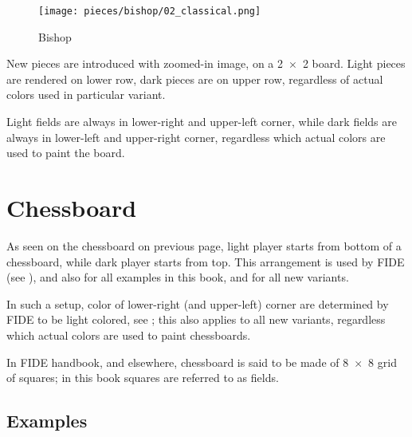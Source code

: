 \noindent
\begin{wrapfigure}[12]{l}{0.4\textwidth}
\centering
\texttt{[image: pieces/bishop/02\_classical.png]}
\caption{Bishop}
\label{fig:bishop/02_classical}
\end{wrapfigure}
New pieces are introduced with zoomed-in image, on a \mbox{2 $\times$ 2} board.
Light pieces are rendered on lower row, dark pieces are on upper row,
regardless of actual colors used in particular variant. %

Light fields are always in lower-right and upper-left corner, while dark fields
are always in lower-left and upper-right corner, regardless which actual colors
are used to paint the board.


\section*{Chessboard}
\label{sec:Classical Chess/Chessboard}

As seen on the chessboard on previous page, light player starts from bottom of
a chessboard, while dark player starts from top. This arrangement is used by FIDE
(see ), and also for all examples in this book, and for all new
variants.

In such a setup, color of lower-right (and upper-left) corner are determined by
FIDE to be light colored, see ; this also applies to all new
variants, regardless which actual colors are used to paint chessboards.

In FIDE handbook, and elsewhere, chessboard is said to be made of \mbox{8 $\times$ 8}
grid of squares; in this book squares are referred to as fields.

\clearpage %

\subsection*{Examples}
\label{sec:Classical Chess/Chessboard/Examples}


